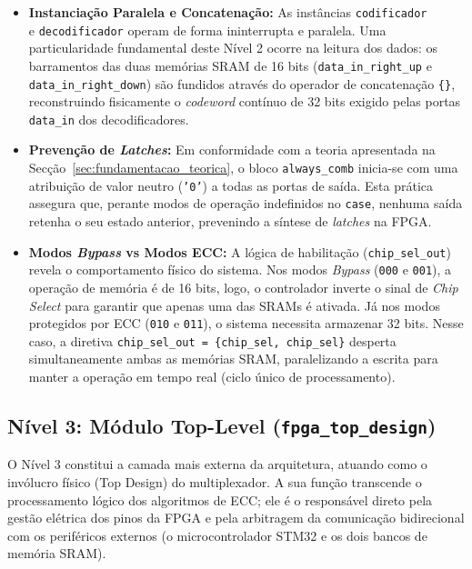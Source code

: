 \documentclass[12pt,a4paper]{article}
\begin{document}
\begin{itemize}
    \item \textbf{Instanciação Paralela e Concatenação:} As instâncias \texttt{codificador} \\e \texttt{decodificador} operam de forma ininterrupta e paralela. Uma particularidade fundamental deste Nível 2 ocorre na leitura dos dados: os barramentos das duas memórias SRAM de 16 bits (\texttt{data\_in\_right\_up} e \texttt{data\_in\_right\_down}) são fundidos através do operador de concatenação \texttt{\{\}}, reconstruindo fisicamente o \textit{codeword} contínuo de 32 bits exigido pelas portas \texttt{data\_in} dos decodificadores.
    \item \textbf{Prevenção de \textit{Latches}:} Em conformidade com a teoria apresentada na Secção~\ref{sec:fundamentacao_teorica}, o bloco \texttt{always\_comb} inicia-se com uma atribuição de valor neutro (\texttt{'0'}) a todas as portas de saída. Esta prática assegura que, perante modos de operação indefinidos no \texttt{case}, nenhuma saída retenha o seu estado anterior, prevenindo a síntese de \textit{latches} na FPGA.
    \item \textbf{Modos \textit{Bypass} vs Modos ECC:} A lógica de habilitação (\texttt{chip\_sel\_out}) revela o comportamento físico do sistema. Nos modos \textit{Bypass} (\texttt{000} e \texttt{001}), a operação de memória é de 16 bits, logo, o controlador inverte o sinal de \textit{Chip Select} para garantir que apenas uma das SRAMs é ativada. Já nos modos protegidos por ECC (\texttt{010} e \texttt{011}), o sistema necessita armazenar 32 bits. Nesse caso, a diretiva \texttt{chip\_sel\_out = \{chip\_sel, chip\_sel\}} desperta simultaneamente ambas as memórias SRAM, paralelizando a escrita para manter a operação em tempo real (ciclo único de processamento).
\end{itemize}

\subsection{Nível 3: Módulo Top-Level (\texttt{fpga\_top\_design})}
\label{sec:nivel3_toplevel}

O Nível 3 constitui a camada mais externa da arquitetura, atuando como o invólucro físico (Top Design) do multiplexador. A sua função transcende o processamento lógico dos algoritmos de ECC; ele é o responsável direto pela gestão elétrica dos pinos da FPGA e pela arbitragem da comunicação bidirecional com os periféricos externos (o microcontrolador STM32 e os dois bancos de memória SRAM).
\end{document}
